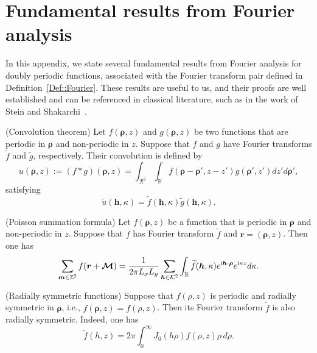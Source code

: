 \section{Fundamental results from Fourier analysis} \label{app::Fourier}
In this appendix, we state several fundamental results from Fourier analysis for doubly periodic functions, associated with the Fourier transform pair defined in Definition~\ref{Def::Fourier}. These results are useful to us, and their proofs are well established and can be referenced in classical literature, such as in the work of Stein and Shakarchi~\cite{stein2011fourier}.
\begin{lem}\label{lem::Convolution}
	(Convolution theorem) Let $f(\bm{\rho},z)$ and $g(\bm{\rho},z)$ be two functions that are periodic in $\bm{\rho}$ and non-periodic in $z$. Suppose that $f$ and $g$ have Fourier transforms $\widetilde{f}$ and $\widetilde{g}$, respectively. Their convolution is defined by
	\begin{equation}\label{eq:Q2D_cov}
		u(\bm{\rho},z):=(f\ast g)(\bm{\rho},z)=\int_{\mathcal{R}^2}\int_{\mathbb{R}}f(\bm{\rho}-\bm{\rho}',z-z')g(\bm{\rho}',z')dz'd\bm{\rho}',
	\end{equation}
	satisfying
	\begin{equation}
		\widetilde{u}(\bm{h},\kappa)=\widetilde{f}(\bm{h},\kappa)\widetilde{g}(\bm{h},\kappa).
	\end{equation}
	
\end{lem}
\begin{lem}\label{lem::Poisson}
	(Poisson summation formula) Let $f(\bm{\rho},z)$ be a function that is periodic in $\bm{\rho}$ and non-periodic in $z$. Suppose that $f$ has Fourier transform $\widetilde{f}$ and $\bm{r}=(\bm{\rho},z)$. Then one has
	\begin{equation}
		\sum_{\bm{m}\in \mathbb{Z}^2} f(\bm{r} + \boldsymbol{\mathcal{M}}) = \frac{1}{2\pi L_x L_y}\sum_{\bm{h}\in \mathcal{K}^2}\int_{\mathbb{R}}\widetilde{f}(\bm{h},\kappa)e^{\mathrm{i} \bm{h}\cdot\bm{\rho}}e^{\mathrm{i} \kappa z}d\kappa.
	\end{equation}
\end{lem}
\begin{lem}\label{lem::2dfourier}
	(Radially symmetric functions) 
	Suppose that $f(\rho,z)$ is periodic and radially symmetric in $\bm{\rho}$, i.e., $f(\bm{\rho},z)=f(\rho,z)$. Then its Fourier transform $\widetilde{f}$ is also radially symmetric. Indeed, one has
	\begin{equation}
		\widetilde{f}(h,z)=2\pi\int_{0}^{\infty}J_0(h \rho)f(\rho,z)\rho \,d\rho.
	\end{equation}
\end{lem}


